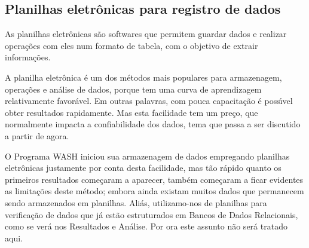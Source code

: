 \documentclass[
12pt,		%
openright,	%
twoside,  %
a4paper,			%
chapter=TITLE,		%
english,			%
french,				%
spanish,			%
brazil				%
]{USPSC-classe/USPSC}
\begin{document}
\noindent\begin{center}\mbox{\centering{}}\end{center}


\subsection[Planilhas eletr\^onicas para registro de dados]{Planilhas eletr\^onicas para registro de dados}\label{Planilhas eletr\^onicas para registro de dados}
As planilhas eletr\^onicas s\~ao softwares que permitem guardar dados e realizar opera\c{c}\~oes com eles num formato de tabela, com o objetivo de  extrair informa\c{c}\~oes.

















A planilha eletr\^onica \'e um dos m\'etodos mais populares para armazenagem, opera\c{c}\~oes e an\'alise de dados, porque tem uma curva de aprendizagem relativamente favor\'avel. Em outras palavras, com pouca capacita\c{c}\~ao \'e poss\'{\i}vel obter resultados rapidamente. Mas esta facilidade tem um pre\c{c}o, que normalmente impacta a confiabilidade dos dados, tema que passa a ser discutido a partir de agora.

















O Programa WASH iniciou sua armazenagem de dados empregando planilhas eletr\^onicas justamente por conta desta facilidade, mas t\~ao r\'apido quanto os primeiros resultados come\c{c}aram a aparecer, tamb\'em come\c{c}aram a ficar evidentes as limita\c{c}\~oes deste m\'etodo; embora ainda existam muitos dados que permanecem sendo armazenados em planilhas. Ali\'as, utilizamo-nos de planilhas para verifica\c{c}\~ao de dados que j\'a est\~ao estruturados em Bancos de Dados Relacionais, como se ver\'a nos Resultados e An\'alise. Por ora este assunto n\~ao ser\'a tratado aqui.
\end{document}
